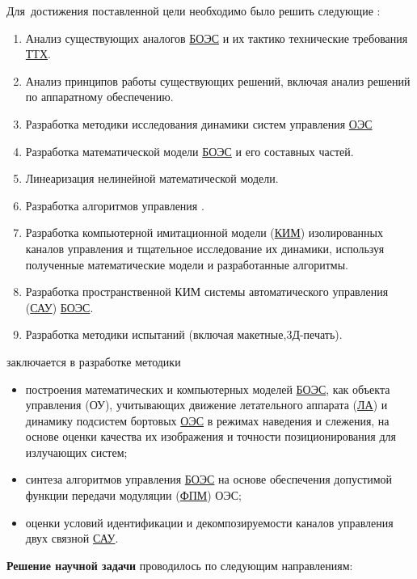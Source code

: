 Для~достижения поставленной цели необходимо было решить следующие {\tasks}:
\begin{enumerate}
  \item Анализ существующих аналогов \hyperref[acroAEOS]{БОЭС} и их тактико технические требования \hyperref[acroTTX]{ТТХ}.
  \item Анализ принципов работы существующих решений, включая анализ решений по аппаратному обеспечению.
  \item Разработка методики исследования динамики систем управления \hyperref[acroEOS]{ОЭС}
  \item Разработка математической модели \hyperref[acroAEOS]{БОЭС} и его составных частей.
  \item Линеаризация нелинейной математической модели.
  \item Разработка алгоритмов управления .
  \item Разработка компьютерной имитационной модели (\hyperref[acroCSM]{КИМ}) изолированных каналов управления и тщательное исследование их динамики, используя полученные математические модели и разработанные алгоритмы.
  \item Разработка пространственной КИМ системы автоматического управления (\hyperref[acroSAU]{САУ}) \hyperref[acroAEOS]{БОЭС}.
  \item Разработка методики испытаний (включая макетные,3Д-печать).
\end{enumerate}


{\novelty} заключается в разработке методики
\begin{itemize}
  \item построения математических и компьютерных моделей \hyperref[acroAEOS]{БОЭС}, как объекта управления (ОУ), учитывающих движение летательного аппарата (\hyperref[acroLA]{ЛА}) и динамику подсистем бортовых  \hyperref[acroEOS]{ОЭС} в режимах наведения и слежения, на основе оценки качества их изображения и точности позиционирования для излучающих систем;
  \item синтеза алгоритмов управления \hyperref[acroAEOS]{БОЭС} на основе обеспечения допустимой функции передачи модуляции (\hyperref[acroFPM]{ФПМ}) ОЭС;
  \item оценки условий идентификации и декомпозируемости каналов управления двух связной \hyperref[acroSAU]{САУ}.
 
\end{itemize}

\textbf{Решение научной задачи} проводилось по следующим направлениям:


